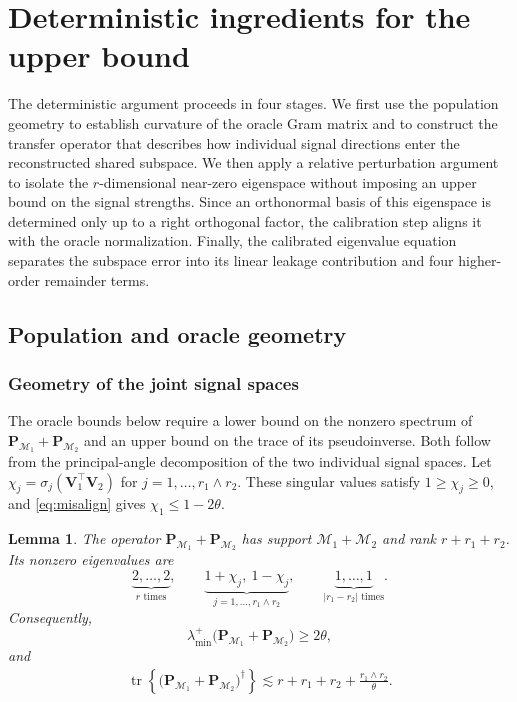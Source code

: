 \documentclass[11pt]{article}
\newtheorem{lemma}{Lemma}
\newcommand{\trans}{\top}
\DeclareMathOperator{\tr}{tr}
\newcommand{\lmin}{\lambda^{+}_{\min}}
\newcommand{\cM}{\mathcal{M}}
\begin{document}
\section{Deterministic ingredients for the upper bound}
The deterministic argument proceeds in four stages. We first use the
population geometry to establish curvature of the oracle Gram matrix and to
construct the transfer operator that describes how individual signal
directions enter the reconstructed shared subspace. We then apply a relative
perturbation argument to isolate the $r$-dimensional near-zero eigenspace
without imposing an upper bound on the signal strengths. Since an orthonormal
basis of this eigenspace is determined only up to a right orthogonal factor,
the calibration step aligns it with the oracle normalization. Finally, the
calibrated eigenvalue equation separates the subspace error into its linear
leakage contribution and four higher-order remainder terms.
\subsection{Population and oracle geometry}

\subsubsection{Geometry of the joint signal spaces}
\label{app:joint-subspace-geometry}

The oracle bounds below require a lower bound on the nonzero spectrum of
$\bm P_{\cM_1}+\bm P_{\cM_2}$ and an upper bound on the trace of its
pseudoinverse. Both follow from the principal-angle decomposition of the two
individual signal spaces. Let
$\chi_j=\sigma_j(\bm V_1^\trans\bm V_2)$ for
$j=1,\ldots,r_1\wedge r_2$. These singular values satisfy
$1\ge\chi_j\ge0$, and \cref{eq:misalign} gives
$\chi_1\le1-2\theta$.


\begin{lemma}
\label{lem:joint-subspace-geometry}
The operator
$\bm P_{\cM_1}+\bm P_{\cM_2}$ has support
$\cM_1+\cM_2$ and rank $r + r_1 + r_2$.
Its nonzero eigenvalues are
\begin{equation}
\label{eq:projector-sum-spectrum}
  \underbrace{2,\ldots,2}_{r\text{ times}},
  \qquad
  \underbrace{1+\chi_j,\ 1-\chi_j}_{j =1, \ldots, r_1 \wedge r_2},
  \qquad
  \underbrace{1,\ldots,1}_{|r_1-r_2|\text{ times}}.
\end{equation}
Consequently,
\begin{equation}
\label{eq:projector-sum-floor}
  \lmin\bigl(
    \bm P_{\cM_1}+\bm P_{\cM_2}
  \bigr)
  \ge 2\theta,
\end{equation}
and
\begin{equation}
\label{eq:projector-sum-pseudoinverse-trace}
\begin{aligned}
  \tr\left\{
    \bigl(
      \bm P_{\cM_1}+\bm P_{\cM_2}
    \bigr)^\dagger
  \right\}
  \lesssim
  r+r_1+r_2+\frac{r_1 \wedge r_2}{\theta}.
\end{aligned}
\end{equation}
\end{lemma}
\end{document}
